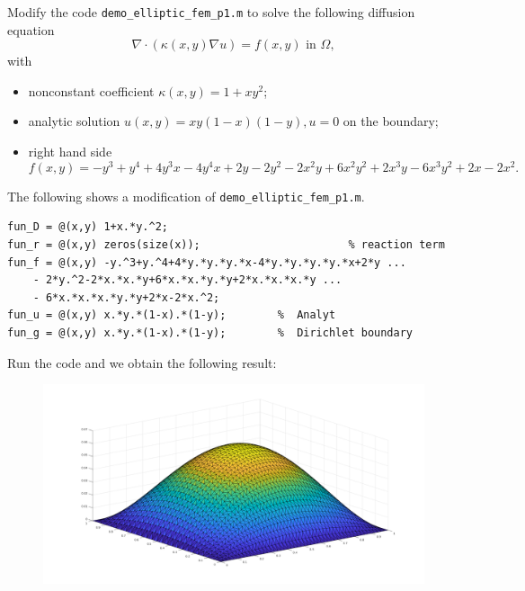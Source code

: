 \begin{pro}
  Modify the code \verb|demo_elliptic_fem_p1.m| to solve the following
  diffusion equation
  \begin{displaymath}
    \nabla\cdot(\kappa(x,y)\nabla u) = f(x, y) \text{ in } \Omega,
  \end{displaymath}
  with
  \begin{itemize}
  \item
    nonconstant coefficient $\kappa(x, y) = 1+xy^2$;
  \item
    analytic solution $u(x, y) = xy(1-x)(1-y), u=0$ on the boundary;
  \item
    right hand side
    \begin{displaymath}
      f(x, y) = -y^3+y^4+4y^3x-4y^4x+2y-2y^2-2x^2y+6x^2y^2+2x^3y
      - 6x^3y^2 + 2x - 2x^2.
    \end{displaymath}
  \end{itemize}
\end{pro}
\begin{sol}
  The following shows a modification of \verb|demo_elliptic_fem_p1.m|.
\begin{verbatim}
fun_D = @(x,y) 1+x.*y.^2;
fun_r = @(x,y) zeros(size(x));                       % reaction term
fun_f = @(x,y) -y.^3+y.^4+4*y.*y.*y.*x-4*y.*y.*y.*y.*x+2*y ...
    - 2*y.^2-2*x.*x.*y+6*x.*x.*y.*y+2*x.*x.*x.*y ...
    - 6*x.*x.*x.*y.*y+2*x-2*x.^2;
fun_u = @(x,y) x.*y.*(1-x).*(1-y);        %  Analyt
fun_g = @(x,y) x.*y.*(1-x).*(1-y);        %  Dirichlet boundary
\end{verbatim}
  Run the code and we obtain the following result:
    \begin{figure}[H]
    \centering
    \includegraphics[scale=0.32]{png/fem.png}
  \end{figure}
\end{sol}
